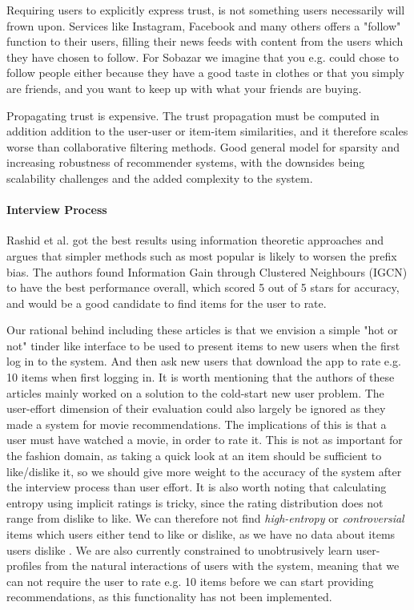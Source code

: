 Requiring users to explicitly express trust, is not something users necessarily
will frown upon. Services like Instagram, Facebook and many others offers a
"follow" function to their users, filling their news feeds with content from
the users which they have chosen to follow. For Sobazar we imagine that you
e.g. could chose to follow people either because they have a good taste in
clothes or that you simply are friends, and you want to keep up with what your
friends are buying.

Propagating trust is expensive. The trust propagation must be computed in
addition addition to the user-user or item-item similarities, and it therefore
scales worse than collaborative filtering methods. Good general model for
sparsity and increasing robustness of recommender systems, with the downsides
being scalability challenges and the added complexity to the system.

\paragraph{Interview Process}

Rashid et al. \cite{Rashid2008} got the best results using information
theoretic approaches and argues that simpler methods such as most popular is
likely to worsen the prefix bias. The authors found Information Gain through
Clustered Neighbours (IGCN) to have the best performance overall, which scored
5 out of 5 stars for accuracy, and would be a good candidate to find items for
the user to rate.


Our rational behind including these articles is that we envision a simple "hot
or not" tinder like interface to be used to present items to new users when the
first log in to the system. And then ask new users that download the app to
rate e.g. 10 items when first logging in. It is worth mentioning that the
authors of these articles mainly worked on a solution to the cold-start new
user problem. The user-effort dimension of their evaluation could also largely
be ignored as they made a system for movie recommendations. The implications of
this is that a user must have watched a movie, in order to rate it. This is not
as important for the fashion domain, as taking a quick look at an item should
be sufficient to like/dislike it, so we should give more weight to the accuracy
of the system after the interview process than user effort. It is also worth
noting that calculating entropy using implicit ratings is tricky, since the
rating distribution does not range from dislike to like. We can therefore not
find \emph{high-entropy} or \emph{controversial} items which users either tend
to like or dislike, as we have no data about items users dislike
. We are also currently constrained to unobtrusively learn
user-profiles from the natural interactions of users with the system, meaning
that we can not require the user to rate e.g. 10 items before we can start
providing recommendations, as this functionality has not been implemented.

